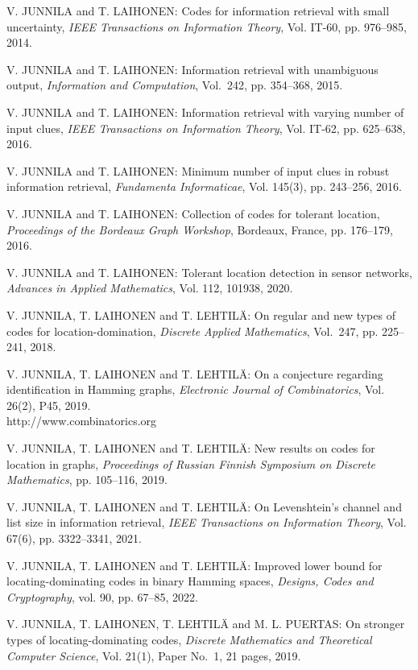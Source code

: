 \begin{thebibliography}{999}
V. JUNNILA and T. LAIHONEN: Codes for information retrieval with small uncertainty, {\it IEEE Transactions on Information Theory}, Vol. IT-60, pp. 976--985, 2014.

  V. JUNNILA and T. LAIHONEN: Information retrieval with unambiguous output, {\it Information and Computation}, Vol.~242, pp. 354--368, 2015.

V. JUNNILA and T. LAIHONEN: Information retrieval with varying number of input clues, {\it IEEE Transactions on Information Theory}, Vol. IT-62, pp. 625--638, 2016.

V. JUNNILA and T. LAIHONEN: Minimum number of input clues in robust information retrieval, {\it Fundamenta Informaticae}, Vol. 145(3), pp. 243--256, 2016.

V. JUNNILA and T. LAIHONEN: Collection of codes for tolerant location, {\it Proceedings of the Bordeaux Graph Workshop}, Bordeaux, France, pp. 176--179, 2016.

V. JUNNILA and T. LAIHONEN: Tolerant location detection in sensor networks, {\it Advances in Applied Mathematics}, Vol. 112, 101938, 2020.

V. JUNNILA, T. LAIHONEN and T. LEHTIL\"A: On regular and new types of codes for location-domination, {\it Discrete Applied Mathematics}, Vol.~247, pp. 225--241, 2018.

V. JUNNILA, T. LAIHONEN and T. LEHTIL\"A: On a conjecture regarding identification in Hamming graphs, {\it Electronic Journal of Combinatorics}, Vol. 26(2), P45, 2019.\\
http://www.combinatorics.org

V. JUNNILA, T. LAIHONEN and T. LEHTIL\"A: New results on codes for location in graphs, {\it Proceedings of Russian Finnish Symposium on Discrete Mathematics}, pp. 105--116, 2019.

V. JUNNILA, T. LAIHONEN and T. LEHTIL\"A: On Levenshtein's channel and list size in information retrieval, {\it IEEE Transactions on Information Theory}, Vol. 67(6), pp. 3322--3341, 2021.

V. JUNNILA, T. LAIHONEN and T. LEHTIL\"A: Improved lower bound for locating-dominating codes in binary Hamming spaces, {\it Designs, Codes and Cryptography}, vol. 90, pp. 67--85, 2022.

V. JUNNILA, T. LAIHONEN, T. LEHTIL\"A and M. L. PUERTAS: On stronger types of locating-dominating codes, {\it Discrete Mathematics and Theoretical Computer Science}, Vol. 21(1), Paper No.~1, 21 pages, 2019.


\end{thebibliography}
